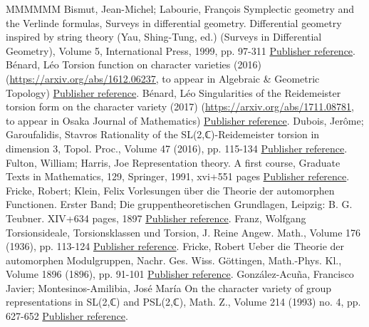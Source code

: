 \begin{thebibliography}{MMMMMM}
 Bismut, Jean-Michel; Labourie, François Symplectic geometry and the Verlinde formulas, Surveys in differential geometry. Differential geometry inspired by string theory (Yau, Shing-Tung, ed.) (Surveys in Differential Geometry), Volume 5, International Press, 1999, pp. 97-311 \href{https://ahl.centre-mersenne.org/item/AHL_2020__3__341_0/#BL}{Publisher reference}.
 Bénard, Léo Torsion function on character varieties (2016) (\url{https://arxiv.org/abs/1612.06237,} to appear in Algebraic \& Geometric Topology) \href{https://ahl.centre-mersenne.org/item/AHL_2020__3__341_0/#Benard2}{Publisher reference}.
 Bénard, Léo Singularities of the Reidemeister torsion form on the character variety (2017) (\url{https://arxiv.org/abs/1711.08781,} to appear in Osaka Journal of Mathematics) \href{https://ahl.centre-mersenne.org/item/AHL_2020__3__341_0/#Benard1}{Publisher reference}.
 Dubois, Jerôme; Garoufalidis, Stavros Rationality of the SL(2,ℂ)-Reidemeister torsion in dimension 3, Topol. Proc., Volume 47 (2016), pp. 115-134 \href{https://ahl.centre-mersenne.org/item/AHL_2020__3__341_0/#DuboisGaroufalidis}{Publisher reference}.
 Fulton, William; Harris, Joe Representation theory. A first course, Graduate Texts in Mathematics, 129, Springer, 1991, xvi+551 pages \href{https://ahl.centre-mersenne.org/item/AHL_2020__3__341_0/#FultonHarris}{Publisher reference}.
 Fricke, Robert; Klein, Felix Vorlesungen über die Theorie der automorphen Functionen. Erster Band; Die gruppentheoretischen Grundlagen, Leipzig: B. G. Teubner. XIV+634 pages, 1897 \href{https://ahl.centre-mersenne.org/item/AHL_2020__3__341_0/#FrickeKlein}{Publisher reference}.
 Franz, Wolfgang Torsionsideale, Torsionsklassen und Torsion, J. Reine Angew. Math., Volume 176 (1936), pp. 113-124 \href{https://ahl.centre-mersenne.org/item/AHL_2020__3__341_0/#Franz37}{Publisher reference}.
 Fricke, Robert Ueber die Theorie der automorphen Modulgruppen, Nachr. Ges. Wiss. Göttingen, Math.-Phys. Kl., Volume 1896 (1896), pp. 91-101 \href{https://ahl.centre-mersenne.org/item/AHL_2020__3__341_0/#Fricke}{Publisher reference}.
 González-Acuña, Francisco Javier; Montesinos-Amilibia, José María On the character variety of group representations in SL(2,ℂ) and PSL(2,ℂ), Math. Z., Volume 214 (1993) no. 4, pp. 627-652 \href{https://ahl.centre-mersenne.org/item/AHL_2020__3__341_0/#AcunaMontesinos}{Publisher reference}.

\end{thebibliography}
